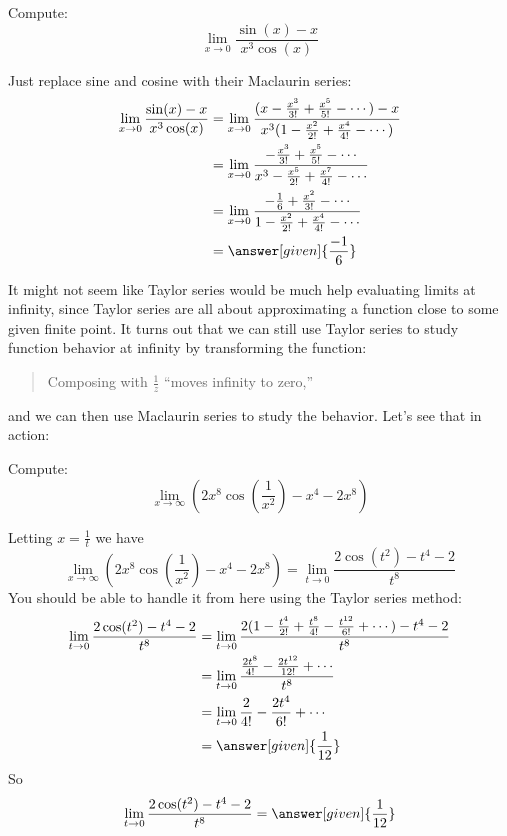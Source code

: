 \documentclass{ximera}
\begin{document}
\begin{example}
  Compute:
  \[
  \lim_{x \to 0} \frac{\sin(x)-x}{x^3\cos(x)} 
  \]
  \begin{explanation}
    Just replace sine and cosine with their Maclaurin series:
    \begin{align*}
      \lim_{x \to 0} \frac{\sin(x)-x}{x^3\cos(x)} &= \lim_{x \to 0} \frac{(x-\frac{x^3}{3!}+\frac{x^5}{5!}-\cdots)-x}{x^3(1-\frac{x^2}{2!}+\frac{x^4}{4!}-\cdots)}\\
      &= \lim_{x \to 0} \frac{-\frac{x^3}{3!}+\frac{x^5}{5!}-\cdots}{x^3 - \frac{x^5}{2!}+\frac{x^7}{4!}-\cdots}\\
      &=\lim_{x \to 0} \frac{-\frac{1}{6}+\frac{x^2}{3!}-\cdots}{1-\frac{x^2}{2!}+\frac{x^4}{4!}-\cdots}\\
      &=\answer[given]{\frac{-1}{6}}
    \end{align*}
  \end{explanation}
\end{example}

It might not seem like Taylor series would be much help evaluating
limits at infinity, since Taylor series are all about approximating a
function close to some given finite point.  It turns out that we can
still use Taylor series to study function behavior at infinity by
transforming the function:
\begin{quote}
  Composing with $\frac{1}{z}$ ``moves infinity to zero,''
\end{quote}
and we can then use Maclaurin series to study the behavior.  Let's see
that in action:

\begin{example}
  Compute:	
  \[
  \lim_{x \to \infty} \left(2x^8\cos\left(\frac{1}{x^2}\right) - x^4-2x^8\right)
  \]
  \begin{explanation}
    Letting $x=\frac{1}{t}$ we have
	\[
	\lim_{x \to \infty} \left(2x^8\cos\left(\frac{1}{x^2}\right) - x^4-2x^8\right)=\lim_{t \to 0} \frac{2\cos\left(t^2\right) - t^4-2}{t^8}
	\]
	You should be able to handle it from here using the Taylor
        series method:
	\begin{align*}
	  \lim_{t \to 0} \frac{2\cos(t^2) - t^4-2}{t^8} &= \lim_{t \to 0} \frac{2(1-\frac{t^4}{2!}+\frac{t^8}{4!}-\frac{t^{12}}{6!}+\cdots) - t^4-2}{t^8}\\
	  &=  \lim_{t \to 0} \frac{\frac{2t^8}{4!}-\frac{2t^{12}}{12!}+\cdots}{t^8}\\
	  &=\lim_{t \to 0} \frac{2}{4!}-\frac{2t^4}{6!} +\cdots\\
	  &=\answer[given]{\frac{1}{12}}
        \end{align*}
        So
	\[
	\lim_{t \to 0} \frac{2\cos(t^2) - t^4-2}{t^8} = \answer[given]{\frac{1}{12}}
	\]
  \end{explanation}	
\end{example}
\end{document}
